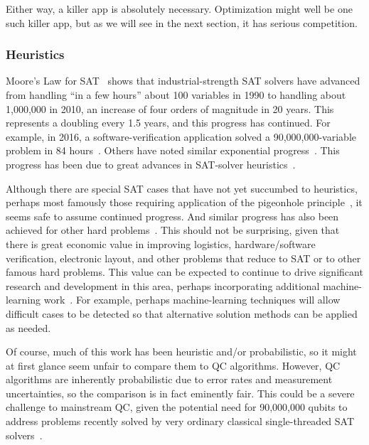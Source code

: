 Either way, a killer app is absolutely necessary.
Optimization might well be one such killer app, but as we will see in the
next section, it has serious competition.

\subsubsection{Heuristics}
\label{sec:future:Heuristics}

Moore's Law for SAT~\cite[Fig.~2.3]{Kroening:2008:DPA:1391237} shows
that industrial-strength SAT solvers have advanced from handling
``in a few hours'' about
100 variables in 1990 to handling about 1,000,000 in 2010, an increase
of four orders of magnitude in 20 years.
This represents a doubling every 1.5 years, and this progress has
continued.
For example, in 2016, a software-verification application solved a
90,000,000-variable problem in 84 hours~\cite{LihaoLiang2016VerifyTreeRCU}.
Others have noted similar exponential
progress~\cite{SharadMalik2010SATSolverHistory,SATCompetition2002,vanHarmelen:2007:HKR:1557461,Malik:2009:BST:1536616.1536637,JamesEzick2014ExtremeSAT}.
This progress has been due to great advances in SAT-solver
heuristics~\cite{Kroening:2008:DPA:1391237,Zhang:2002:QEB:647771.734434,SharadMalik2010SATSolverHistory,Malik:2009:BST:1536616.1536637,Audemard:2009:PLC:1661445.1661509}.

Although there are special SAT cases that have not yet succumbed to
heuristics, perhaps most famously those requiring application of the
pigeonhole principle~\cite[page~38]{Kroening:2008:DPA:1391237},
it seems safe to assume continued progress.
And similar progress has also been achieved for other hard
problems~\cite{WikipediaPrimalityTest,WikipediaTSP,WikipediaIntegerFactorization}.
This should not be surprising, given that there is great economic value
in improving logistics, hardware/software verification, electronic layout,
and other problems that reduce to SAT or to other famous hard problems.
This value can be expected to continue to drive significant research
and development in this area, perhaps incorporating additional
machine-learning work~\cite{ShaiHaim2009SAT-MachineLearning}.
For example, perhaps machine-learning techniques will allow difficult
cases to be detected so that alternative solution methods can be applied
as needed.

Of course, much of this work has been heuristic and/or probabilistic,
so it might at first glance seem unfair to compare them to
QC algorithms.
However, QC algorithms are inherently probabilistic due to error rates
and measurement uncertainties, so the comparison is in fact eminently
fair.
This could be a severe challenge to mainstream QC, given the potential
need for 90,000,000 qubits to address problems recently solved by
very ordinary classical single-threaded SAT
solvers~\cite{LihaoLiang2016VerifyTreeRCU}.


